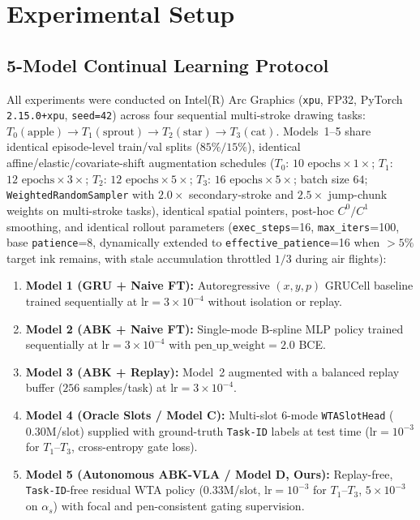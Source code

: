 \documentclass[10pt,twocolumn]{article}
\begin{document}
\section{Experimental Setup}

\subsection{5-Model Continual Learning Protocol}
All experiments were conducted on Intel(R) Arc Graphics (\texttt{xpu}, FP32, PyTorch \texttt{2.15.0+xpu}, \texttt{seed=42}) across four sequential multi-stroke drawing tasks: $T_0(\text{apple}) \rightarrow T_1(\text{sprout}) \rightarrow T_2(\text{star}) \rightarrow T_3(\text{cat})$. Models~1--5 share identical episode-level train/val splits ($85\% / 15\%$), identical affine/elastic/covariate-shift augmentation schedules ($T_0$: $10\text{ epochs} \times 1\times$; $T_1$: $12\text{ epochs} \times 3\times$; $T_2$: $12\text{ epochs} \times 5\times$; $T_3$: $16\text{ epochs} \times 5\times$; batch size $64$; \texttt{WeightedRandomSampler} with $2.0\times$ secondary-stroke and $2.5\times$ jump-chunk weights on multi-stroke tasks), identical spatial pointers, post-hoc $C^0/C^1$ smoothing, and identical rollout parameters (\texttt{exec\_steps}=16, \texttt{max\_iters}=100, base \texttt{patience}=8, dynamically extended to \texttt{effective\_patience}=16 when $>5\%$ target ink remains, with stale accumulation throttled $1/3$ during air flights):
\begin{enumerate}
    \item \textbf{Model 1 (GRU + Naive FT):} Autoregressive $(x, y, p)$ GRUCell baseline trained sequentially at $\text{lr}=3\times 10^{-4}$ without isolation or replay.
    \item \textbf{Model 2 (ABK + Naive FT):} Single-mode B-spline MLP policy trained sequentially at $\text{lr}=3\times 10^{-4}$ with $\text{pen\_up\_weight}=2.0$ BCE.
    \item \textbf{Model 3 (ABK + Replay):} Model~2 augmented with a balanced replay buffer ($256$ samples/task) at $\text{lr}=3\times 10^{-4}$.
    \item \textbf{Model 4 (Oracle Slots / Model C):} Multi-slot 6-mode \texttt{WTASlotHead} ($0.30\text{M}$/slot) supplied with ground-truth \texttt{Task-ID} labels at test time ($\text{lr}=10^{-3}$ for $T_1$--$T_3$, cross-entropy gate loss).
    \item \textbf{Model 5 (Autonomous ABK-VLA / Model D, Ours):} Replay-free, \texttt{Task-ID}-free residual WTA policy ($0.33\text{M}$/slot, $\text{lr}=10^{-3}$ for $T_1$--$T_3$, $5\times 10^{-3}$ on $\alpha_s$) with focal and pen-consistent gating supervision.
\end{enumerate}
\end{document}
